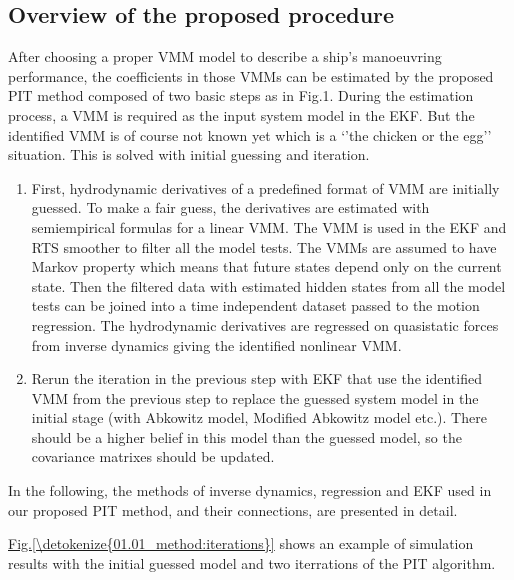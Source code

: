 \documentclass[review]{elsarticle}
\begin{document}
\subsection{Overview of the proposed procedure}
\label{\detokenize{01.01_method:overview-of-the-proposed-procedure}}
\sphinxAtStartPar
After choosing a proper VMM model to describe a ship’s manoeuvring performance, the coefficients in those VMMs can be estimated by the proposed PIT method composed of two basic steps as in Fig.1. During the estimation process, a VMM is required as the input system model in the EKF. But the identified VMM is of course not known yet which is a ‘’the chicken or the egg’’ situation. This is solved with initial guessing and iteration.
\begin{enumerate}
%
\item {} 
\sphinxAtStartPar
First, hydrodynamic derivatives of a pre\sphinxhyphen{}defined format of VMM are initially guessed. To make a fair guess, the derivatives are estimated with semi\sphinxhyphen{}empirical formulas for a linear VMM. The VMM is used in the EKF and RTS smoother to filter all the model tests. The VMMs are assumed to have Markov property which means that future states depend only on the current state. Then the filtered data with estimated hidden states from all the model tests can be joined into a time independent dataset passed to the motion regression. The hydrodynamic derivatives are regressed on quasi\sphinxhyphen{}static forces from inverse dynamics giving the identified nonlinear VMM.

\item {} 
\sphinxAtStartPar
Re\sphinxhyphen{}run the iteration in the previous step with EKF that use the identified VMM from the previous step to replace the guessed system model in the initial stage (with Abkowitz model, Modified Abkowitz model etc.). There should be a higher belief in this model than the guessed model, so the covariance matrixes should be updated.

\end{enumerate}

\sphinxAtStartPar
In the following, the methods of inverse dynamics, regression and EKF used in our proposed PIT method, and their connections, are presented in detail.

\sphinxAtStartPar
\hyperref[\detokenize{01.01_method:iterations}]{Fig.\@ \ref{\detokenize{01.01_method:iterations}}} shows an example of simulation results with the initial guessed model and two iterrations of the PIT algorithm.
\end{document}
